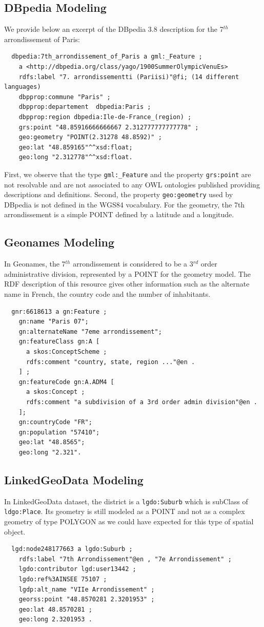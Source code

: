 \subsection{DBpedia Modeling}
We provide below an excerpt of the DBpedia 3.8 description for the 7$^{th}$ arrondissement of Paris:
{\small
\begin{verbatim}
  dbpedia:7th_arrondissement_of_Paris a gml:_Feature ;
    a <http://dbpedia.org/class/yago/1900SummerOlympicVenuEs>
    rdfs:label "7. arrondissementti (Pariisi)"@fi; (14 different languages)
    dbpprop:commune "Paris" ;
    dbpprop:departement  dbpedia:Paris ;
    dbpprop:region dbpedia:Ile-de-France_(region) ;
    grs:point "48.85916666666667 2.312777777777778" ;
    geo:geometry "POINT(2.31278 48.8592)" ;
    geo:lat "48.859165"^^xsd:float;
    geo:long "2.312778"^^xsd:float.
\end{verbatim}
}
First, we observe that the type \texttt{gml:\_Feature} and the property \texttt{grs:point} are not resolvable and are not associated to any OWL ontologies published providing descriptions and definitions. Second, the property \texttt{geo:geometry} used by DBpedia is not defined in the WGS84 vocabulary. For the geometry, the 7th arrondissement is a simple POINT defined by a latitude and a longitude.

\subsection{Geonames Modeling}
In Geonames, the 7$^{th}$ arrondissement is considered to be a 3$^{rd}$ order administrative division, represented by a POINT for the geometry model. The RDF description of this resource gives other information such as the alternate name in French, the country code and the number of inhabitants.
{\small
\begin{verbatim}
  gnr:6618613 a gn:Feature ;
    gn:name "Paris 07";
    gn:alternateName "7eme arrondissement";
    gn:featureClass gn:A [
      a skos:ConceptScheme ;
      rdfs:comment "country, state, region ..."@en .
    ] ;
    gn:featureCode gn:A.ADM4 [
      a skos:Concept ;
      rdfs:comment "a subdivision of a 3rd order admin division"@en .
    ];
    gn:countryCode "FR";
    gn:population "57410";
    geo:lat "48.8565";
    geo:long "2.321".
\end{verbatim}
}

\subsection{LinkedGeoData Modeling}
In LinkedGeoData dataset, the district is a \texttt{lgdo:Suburb} which is subClass of \texttt{ldgo:Place}. Its geometry is still modeled as a POINT and not as a complex geometry of type POLYGON as we could have expected for this type of spatial object.
{\small
\begin{verbatim}
  lgd:node248177663 a lgdo:Suburb ;
    rdfs:label "7th Arrondissement"@en , "7e Arrondissement" ;
    lgdo:contributor lgd:user13442 ;
    lgdo:ref%3AINSEE 75107 ;
    lgdp:alt_name "VIIe Arrondissement" ;
    georss:point "48.8570281 2.3201953" ;
    geo:lat 48.8570281 ;
    geo:long 2.3201953 .
\end{verbatim}
}

